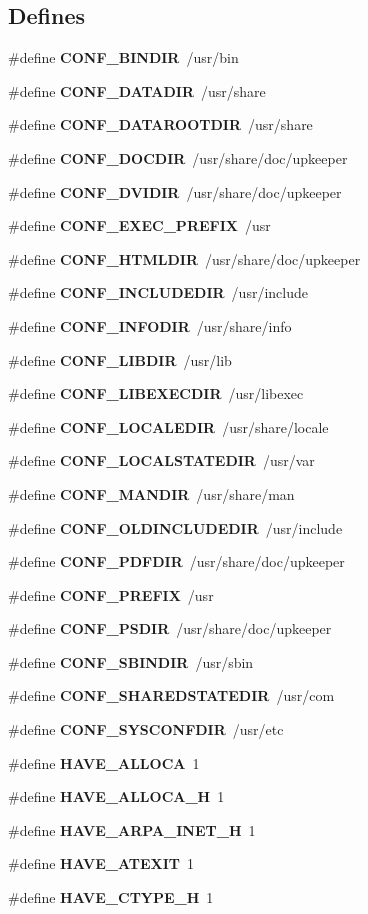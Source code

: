 \subsection*{Defines}
\begin{DoxyCompactItemize}
\item 
\#define {\bf CONF\_\-BINDIR}~/usr/bin
\item 
\#define {\bf CONF\_\-DATADIR}~/usr/share
\item 
\#define {\bf CONF\_\-DATAROOTDIR}~/usr/share
\item 
\#define {\bf CONF\_\-DOCDIR}~/usr/share/doc/upkeeper
\item 
\#define {\bf CONF\_\-DVIDIR}~/usr/share/doc/upkeeper
\item 
\#define {\bf CONF\_\-EXEC\_\-PREFIX}~/usr
\item 
\#define {\bf CONF\_\-HTMLDIR}~/usr/share/doc/upkeeper
\item 
\#define {\bf CONF\_\-INCLUDEDIR}~/usr/include
\item 
\#define {\bf CONF\_\-INFODIR}~/usr/share/info
\item 
\#define {\bf CONF\_\-LIBDIR}~/usr/lib
\item 
\#define {\bf CONF\_\-LIBEXECDIR}~/usr/libexec
\item 
\#define {\bf CONF\_\-LOCALEDIR}~/usr/share/locale
\item 
\#define {\bf CONF\_\-LOCALSTATEDIR}~/usr/var
\item 
\#define {\bf CONF\_\-MANDIR}~/usr/share/man
\item 
\#define {\bf CONF\_\-OLDINCLUDEDIR}~/usr/include
\item 
\#define {\bf CONF\_\-PDFDIR}~/usr/share/doc/upkeeper
\item 
\#define {\bf CONF\_\-PREFIX}~/usr
\item 
\#define {\bf CONF\_\-PSDIR}~/usr/share/doc/upkeeper
\item 
\#define {\bf CONF\_\-SBINDIR}~/usr/sbin
\item 
\#define {\bf CONF\_\-SHAREDSTATEDIR}~/usr/com
\item 
\#define {\bf CONF\_\-SYSCONFDIR}~/usr/etc
\item 
\#define {\bf HAVE\_\-ALLOCA}~1
\item 
\#define {\bf HAVE\_\-ALLOCA\_\-H}~1
\item 
\#define {\bf HAVE\_\-ARPA\_\-INET\_\-H}~1
\item 
\#define {\bf HAVE\_\-ATEXIT}~1
\item 
\#define {\bf HAVE\_\-CTYPE\_\-H}~1

\end{DoxyCompactItemize}
